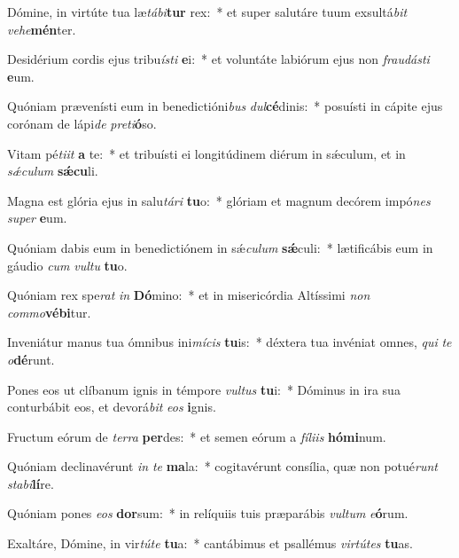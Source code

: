 \item Dómine, in virtúte tua læ\textit{tá}\textit{bi}\textbf{tur} rex:~* et super salutáre tuum exsultá\textit{bit} \textit{ve}\textit{he}\textbf{mén}ter.
\item Desidérium cordis ejus tribu\textit{ís}\textit{ti} \textbf{e}i:~* et voluntáte labiórum ejus non \textit{frau}\textit{dás}\textit{ti} \textbf{e}um.
\item Quóniam prævenísti eum in benedictióni\textit{bus} \textit{dul}\textbf{cé}dinis:~* posuísti in cápite ejus corónam de lápi\textit{de} \textit{pre}\textit{ti}\textbf{ó}so.
\item Vitam pé\textit{ti}\textit{it} \textbf{a} te:~* et tribuísti ei longitúdinem diérum in sǽculum, et in \textit{sǽ}\textit{cu}\textit{lum} \textbf{sǽ}\textbf{cu}li.
\item Magna est glória ejus in salu\textit{tá}\textit{ri} \textbf{tu}o:~* glóriam et magnum decórem impó\textit{nes} \textit{su}\textit{per} \textbf{e}um.
\item Quóniam dabis eum in benedictiónem in sǽ\textit{cu}\textit{lum} \textbf{sǽ}culi:~* lætificábis eum in gáudio \textit{cum} \textit{vul}\textit{tu} \textbf{tu}o.
\item Quóniam rex spe\textit{rat} \textit{in} \textbf{Dó}mino:~* et in misericórdia Altíssimi \textit{non} \textit{com}\textit{mo}\textbf{vé}\textbf{bi}tur.
\item Inveniátur manus tua ómnibus ini\textit{mí}\textit{cis} \textbf{tu}is:~* déxtera tua invéniat omnes, \textit{qui} \textit{te} \textit{o}\textbf{dé}runt.
\item Pones eos ut clíbanum ignis in témpore \textit{vul}\textit{tus} \textbf{tu}i:~* Dóminus in ira sua conturbábit eos, et devorá\textit{bit} \textit{e}\textit{os} \textbf{i}gnis.
\item Fructum eórum de \textit{ter}\textit{ra} \textbf{per}des:~* et semen eórum a \textit{fí}\textit{li}\textit{is} \textbf{hó}\textbf{mi}num.
\item Quóniam declinavérunt \textit{in} \textit{te} \textbf{ma}la:~* cogitavérunt consília, quæ non potué\textit{runt} \textit{sta}\textit{bi}\textbf{lí}re.
\item Quóniam pones \textit{e}\textit{os} \textbf{dor}sum:~* in relíquiis tuis præparábis \textit{vul}\textit{tum} \textit{e}\textbf{ó}rum.
\item Exaltáre, Dómine, in vir\textit{tú}\textit{te} \textbf{tu}a:~* cantábimus et psallémus \textit{vir}\textit{tú}\textit{tes} \textbf{tu}as.
